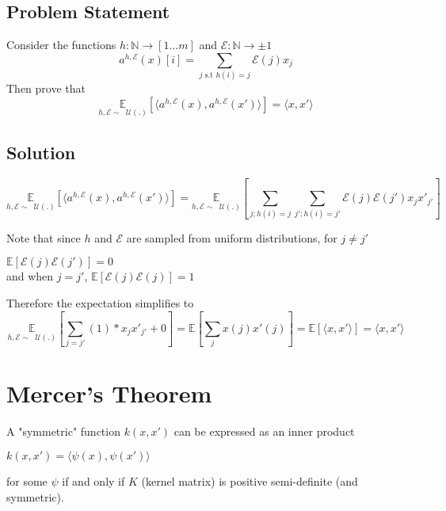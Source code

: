 \documentclass[12pt]{article}
\begin{document}
\subsection{Problem Statement}
Consider the functions $h : \mathbb{N} \rightarrow [1 \dots m] $ and $\mathcal{E} : \mathbb{N} \rightarrow \pm 1$
\[a^{h,\mathcal{E}}(x)[i] = \sum_{j \text{  s.t  } h(i) = j} \mathcal{E}(j)x_{j}\]
Then prove that 
\[ \underset{h,\mathcal{E} \sim \; \;\mathcal{U}(.)}{\mathbb{E}} [ \langle a^{h,\mathcal{E}}(x), a^{h,\mathcal{E}}(x')\rangle ] = \langle x,x' \rangle\]

\subsection{Solution}

\begin{center}
\[ \underset{h,\mathcal{E} \sim \; \;\mathcal{U}(.)}{\mathbb{E}} [ \langle a^{h,\mathcal{E}}(x), a^{h,\mathcal{E}}(x')\rangle ] = \underset{h,\mathcal{E} \sim \; \;\mathcal{U}(.)}{\mathbb{E}} [\sum_{j;h(i) = j} \sum_{j';h(i) = j'}\mathcal{E}(j)\mathcal{E}(j') x_{j} x'_{j'}] \]
\end{center}

Note that since $h$ and $\mathcal{E}$ are sampled from uniform distributions, for $j \neq j'$ 

\begin{center}
$\mathbb{E}[\mathcal{E}(j)\mathcal{E}(j')] = 0 $\\ 

and when $j = j'$, $\mathbb{E}[\mathcal{E}(j)\mathcal{E}(j)] = 1$
\end{center}



Therefore the expectation simplifies to 
\[\underset{h,\mathcal{E} \sim \; \;\mathcal{U}(.)}{\mathbb{E}} [\sum_{j = j'} (1)*x_{j} x'_{j'} + 0]  = \mathbb{E} [\sum_{j} x(j)x'(j)] = \mathbb{E}[\langle x,x'\rangle] = \langle x,x' \rangle  \]







\section{Mercer's Theorem}
\begin{theorem}

A "symmetric" function $k(x,x')$ can be expressed as an inner product
\begin{center}
    $k(x,x')=\langle\psi(x),\psi(x')\rangle$
\end{center}
for some $\psi$ if and only if $K$ (kernel matrix) is positive semi-definite (and symmetric).
\end{theorem}
\end{document}
